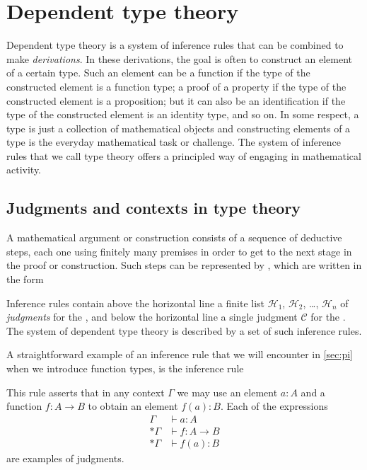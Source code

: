 \section{Dependent type theory}%
\label{sec:dtt}%
%

Dependent type theory is a system of inference rules that can be combined to make \emph{derivations}. In these derivations, the goal is often to construct an element of a certain type. Such an element can be a function if the type of the constructed element is a function type; a proof of a property if the type of the constructed element is a proposition; but it can also be an identification if the type of the constructed element is an identity type, and so on. In some respect, a type is just a collection of mathematical objects and constructing elements of a type is the everyday mathematical task or challenge. The system of inference rules that we call type theory offers a principled way of engaging in mathematical activity.

\subsection{Judgments and contexts in type theory}%
%
%

A mathematical argument or construction consists of a sequence of deductive steps, each one using finitely many premises in order to get to the next stage in the proof or construction. Such steps can be represented by , which are written in the form
\begin{prooftree}
\end{prooftree}
Inference rules contain above the horizontal line a finite list $\mathcal{H}_1$, $\mathcal{H}_2$, \dots, $\mathcal{H}_n$ of \emph{judgments} for the , and below the horizontal line a single judgment $\mathcal{C}$ for the . The system of dependent type theory is described by a set of such inference rules.

A straightforward example of an inference rule that we will encounter in \cref{sec:pi} when we introduce function types, is the inference rule
\begin{prooftree}
\end{prooftree}
This rule asserts that in any context $\Gamma$ we may use an element $a:A$ and a function $f:A\to B$ to obtain an element $f(a):B$. Each of the expressions
\begin{align*}
  \Gamma & \vdash a :A \\*
  \Gamma & \vdash f : A \to B \\*
  \Gamma & \vdash f(a):B
\end{align*}
are examples of judgments.

